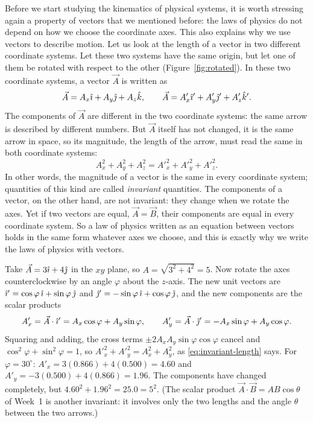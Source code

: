 \documentclass[11pt,a4paper]{article}
\begin{document}
Before we start studying the kinematics of physical systems, it is worth stressing again a
property of vectors that we mentioned before: the laws of physics do not depend on how we choose
the coordinate axes. This also explains why we use vectors to describe motion. Let us look at the
length of a vector in two different coordinate systems. Let these two systems have the same
origin, but let one of them be rotated with respect to the other (Figure~\ref{fig:rotated}). In
these two coordinate systems, a vector $\vec{A}$ is written as
\begin{equation}\label{eq:A-two-systems}
  \vec{A} = A_x\hat{\imath} + A_y\hat{\jmath} + A_z\hat{k} , \qquad
  \vec{A} = A'_x\hat{\imath}' + A'_y\hat{\jmath}' + A'_z\hat{k}' .
\end{equation}
The components of $\vec{A}$ are different in the two coordinate systems: the same arrow is
described by different numbers. But $\vec{A}$ itself has not changed, it is the same arrow in
space, so its magnitude, the length of the arrow, must read the same in both coordinate systems:
\begin{equation}\label{eq:invariant-length}
  A_x^2 + A_y^2 + A_z^2 = A'^2_x + A'^2_y + A'^2_z .
\end{equation}
In other words, the magnitude of a vector is the same in every coordinate system; quantities of
this kind are called \emph{invariant} quantities. The components of a vector, on the other hand,
are not invariant: they change when we rotate the axes. Yet if two vectors are equal,
$\vec{A} = \vec{B}$, their components are equal in every coordinate system. So a law of physics
written as an equation between vectors holds in the same form whatever axes we choose, and this is
exactly why we write the laws of physics with vectors.

\begin{example}
Take $\vec{A} = 3\hat{\imath} + 4\hat{\jmath}$ in the $xy$ plane, so $A = \sqrt{3^2+4^2} = 5$. Now rotate the
axes counterclockwise by an angle $\varphi$ about the $z$-axis. The new unit vectors are
$\hat{\imath}' = \cos\varphi\,\hat{\imath} + \sin\varphi\,\hat{\jmath}$ and $\hat{\jmath}' = -\sin\varphi\,\hat{\imath} +
\cos\varphi\,\hat{\jmath}$, and the new components are the scalar products
\[
  A'_x = \vec{A}\cdot\hat{\imath}' = A_x\cos\varphi + A_y\sin\varphi , \qquad
  A'_y = \vec{A}\cdot\hat{\jmath}' = -A_x\sin\varphi + A_y\cos\varphi .
\]
Squaring and adding, the cross terms $\pm 2A_xA_y\sin\varphi\cos\varphi$ cancel and
$\cos^2\varphi + \sin^2\varphi = 1$, so $A'^2_x + A'^2_y = A_x^2 + A_y^2$, as
\eqref{eq:invariant-length} says. For $\varphi = 30^\circ$: $A'_x = 3(0.866) + 4(0.500) = 4.60$
and $A'_y = -3(0.500) + 4(0.866) = 1.96$. The components have changed completely, but
$4.60^2 + 1.96^2 = 25.0 = 5^2$. (The scalar product $\vec{A}\cdot\vec{B} = AB\cos\theta$ of Week~1
is another invariant: it involves only the two lengths and the angle $\theta$ between the two
arrows.)
\end{example}
\end{document}
